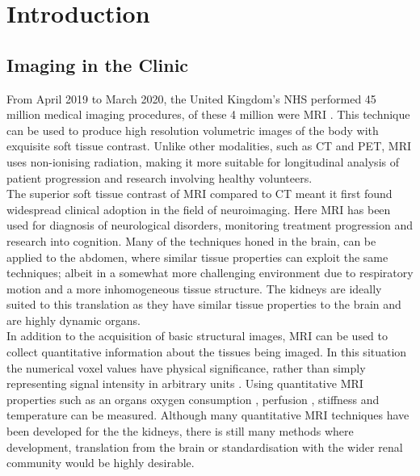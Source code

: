 \chapter{Introduction}
\label{chap:intro}
\section{Imaging in the Clinic}
\label{sec:intro_imaging}
From April 2019 to March 2020, the United Kingdom's \ac{NHS} performed 45 million medical imaging procedures, of these 4 million were \ac{MRI} \cite{noauthor_diagnostic_2020}. This technique can be used to produce high resolution volumetric images of the body with exquisite soft tissue contrast. Unlike other modalities, such as \ac{CT} and \ac{PET}, \ac{MRI} uses non-ionising radiation, making it more suitable for longitudinal analysis of patient progression and research involving healthy volunteers.\\

The superior soft tissue contrast of \ac{MRI} compared to \ac{CT} meant it first found widespread clinical adoption in the field of neuroimaging. Here \ac{MRI} has been used for diagnosis of neurological disorders, monitoring treatment progression and research into cognition. Many of the techniques honed in the brain, can be applied to the abdomen, where similar tissue properties can exploit the same techniques; albeit in a somewhat more challenging environment due to respiratory motion and a more inhomogeneous tissue structure. The kidneys are ideally suited to this translation as they have similar tissue properties to the brain and are highly dynamic organs.\\

In addition to the acquisition of basic structural images, \ac{MRI} can be used to collect quantitative information about the tissues being imaged. In this situation the numerical voxel values have physical significance, rather than simply representing signal intensity in arbitrary units \cite{tofts_quantitative_2003}. Using quantitative \ac{MRI} properties such as an organs oxygen consumption \cite{zhang_quantitative_2015}, perfusion \cite{karger_quantitation_2000}, stiffness \cite{mariappan_magnetic_2010} and temperature \cite{yuan_towards_2012} can be measured. Although many quantitative \ac{MRI} techniques have been developed for the the kidneys, there is still many methods where development, translation from the brain or standardisation with the wider renal community would be highly desirable.

